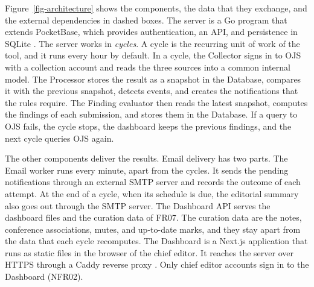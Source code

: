 \documentclass[12pt]{article}
\begin{document}
Figure~\ref{fig-architecture} shows the components, the data that they
exchange, and the external dependencies in dashed boxes. The server is a Go program \cite{golang} that extends PocketBase,
which provides authentication, an API, and persistence in SQLite
\cite{pocketbase,sqlite}. The server works in \emph{cycles}. A cycle is the
recurring unit of work of the tool, and it runs every hour by default. In a
cycle, the Collector signs in to OJS with a collection account and reads the
three sources into a common internal model. The Processor stores the result
as a snapshot in the Database, compares it with the previous snapshot,
detects events, and creates the notifications that the rules require. The
Finding evaluator then reads the latest snapshot, computes the findings of
each submission, and stores them in the Database. If a query to OJS fails,
the cycle stops, the dashboard keeps the previous findings, and the next
cycle queries OJS again.

The other components deliver the results. Email delivery has two parts. The
Email worker runs every minute, apart from the cycles. It sends the pending
notifications through an external SMTP server \cite{smtp} and records the
outcome of each attempt. At the end of a cycle, when its schedule is due,
the editorial summary also goes out through the SMTP server. The Dashboard
API serves the dashboard files and the curation data of FR07. The curation
data are the notes, conference associations, mutes, and up-to-date marks,
and they stay apart from the data that each cycle recomputes. The Dashboard is a Next.js application that runs as static
files \cite{nextestatico} in the browser of the chief editor. It reaches the
server over HTTPS through a Caddy reverse proxy \cite{caddy}. Only chief
editor accounts sign in to the Dashboard (NFR02).
\end{document}
